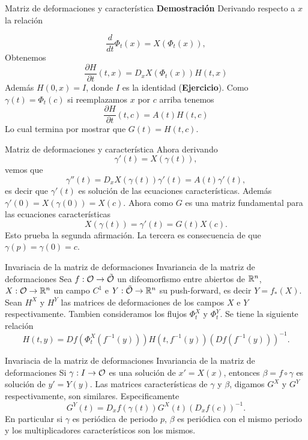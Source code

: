  

{Matriz de deformaciones y característica}
\textbf{Demostración} Derivando respecto a $x$ la relación

\[\frac{d}{dt}\Phi_t(x)=X(\Phi_t(x)),\]
Obtenemos
\[\frac{\partial H}{\partial t}(t,x)=D_xX(\Phi_t(x))H(t,x)\]
Además $H(0,x)=I$, donde $I$ es la identidad (\textbf{Ejercicio}). Como $\gamma(t)=\Phi_t(c)$ si reemplazamos $x$
por $c$ arriba tenemos 
\[
 \frac{\partial H}{\partial t}(t,c)=A(t)H(t,c)
\]
Lo cual termina por mostrar que $G(t)=H(t,c)$. 




{Matriz de deformaciones y característica}
 Ahora derivando
 \[\gamma'(t)=X(\gamma(t)),\]
 vemos que
  \[\gamma''(t)=D_xX(\gamma(t))\gamma'(t)=A(t)\gamma'(t),\]
  es decir que $\gamma'(t)$ es solución de las ecuaciones características. Además $\gamma'(0)=X(\gamma(0))=X(c)$. 
  Ahora como $G$ es una matriz fundamental para las ecuaciones características
  \[X(\gamma(t))=\gamma'(t)=G(t)X(c).\]
  Esto prueba la segunda afirmación. La tercera es consecuencia de que $\gamma(p)=\gamma(0)=c$.
 
 
 
 
 {Invariacia de la matriz de deformaciones}
{Invariancia de la matriz de deformaciones}
Sea $f:\mathcal{O}\to\tilde{\mathcal{O}}$ un difeomorfismo entre abiertos de $\mathbb{R}^n$, $X:\mathcal{O}\to\mathbb{R}^n$ un campo $C^1$ e $Y:\tilde{\mathcal{O}}\to\mathbb{R}^n$ su push-forward, es decir $Y=f_*(X)$.
Sean $H^X$ y $H^Y$ las matrices de deformaciones de los campos $X$ e $Y$ respectivamente. Tambien consideramos los flujos $\Phi_t^X$ y $\Phi_t^Y$. Se tiene la siguiente 
relación
\begin{equation}\label{def_mat}H(t,y)=Df(\Phi^X_t(f^{-1}(y)))H(t,f^{-1}(y)) \left(Df(f^{-1}(y))\right)^{-1}.\end{equation}



 
 
  {Invariacia de la matriz de deformaciones}
{Invariancia de la matriz de deformaciones}
Si $\gamma:I\to\mathcal{O}$ es una solución de $x'=X(x)$, entonces $\beta=f\circ\gamma$ es solución de $y'=Y(y)$. Las matrices características 
de $\gamma$ y $\beta$, digamos  $G^X$ y $G^Y$ respectivamente, son similares. Especificamente
\begin{equation}\label{car_mat}G^Y(t)=D_xf(\gamma(t))G^X(t)\left(D_xf(c)\right)^{-1}.\end{equation}
En particular si $\gamma$ es periódica de periodo $p$, $\beta$ es periódica con el mismo periodo y los multiplicadores característicos son los mismos.




